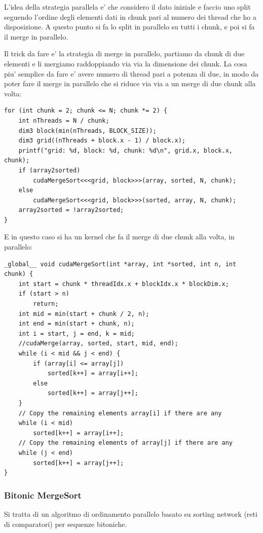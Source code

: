 L'idea della strategia parallela e' che considero il dato iniziale e faccio uno split seguendo l'ordine degli elementi dati in chunk pari al numero dei thread che ho a disposizione. A questo punto si fa lo split in parallelo su tutti i chunk, e poi si fa il merge in parallelo.

Il trick da fare e' la strategia di merge in parallelo, partiamo da chunk di due elementi e li mergiamo raddoppiando via via la dimensione dei chunk.
La cosa piu' semplice da fare e' avere numero di thread pari a potenza di due, in modo da poter fare il merge in parallelo che si riduce via via a un merge di due chunk alla volta:
\begin{lstlisting}
for (int chunk = 2; chunk <= N; chunk *= 2) {
    int nThreads = N / chunk;
    dim3 block(min(nThreads, BLOCK_SIZE));
    dim3 grid((nThreads + block.x - 1) / block.x);
    printf("grid: %d, block: %d, chunk: %d\n", grid.x, block.x, chunk);
    if (array2sorted)
        cudaMergeSort<<<grid, block>>>(array, sorted, N, chunk);
    else
        cudaMergeSort<<<grid, block>>>(sorted, array, N, chunk);
    array2sorted = !array2sorted;
}
\end{lstlisting}

E in questo caso si ha un kernel che fa il merge di due chunk alla volta, in parallelo:
\begin{lstlisting}
_global__ void cudaMergeSort(int *array, int *sorted, int n, int chunk) {
    int start = chunk * threadIdx.x + blockIdx.x * blockDim.x;
    if (start > n)
        return;
    int mid = min(start + chunk / 2, n);
    int end = min(start + chunk, n);
    int i = start, j = end, k = mid;
    //cudaMerge(array, sorted, start, mid, end);
    while (i < mid && j < end) {
        if (array[i] <= array[j])
            sorted[k++] = array[i++];
        else
            sorted[k++] = array[j++];
    }
    // Copy the remaining elements array[i] if there are any
    while (i < mid)
        sorted[k++] = array[i++];
    // Copy the remaining elements of array[j] if there are any
    while (j < end)
        sorted[k++] = array[j++];
}
\end{lstlisting}

\subsubsection{Bitonic MergeSort}

Si tratta di un algoritmo di ordinamento parallelo basato su sorting network (reti di comparatori) per sequenze bitoniche.

